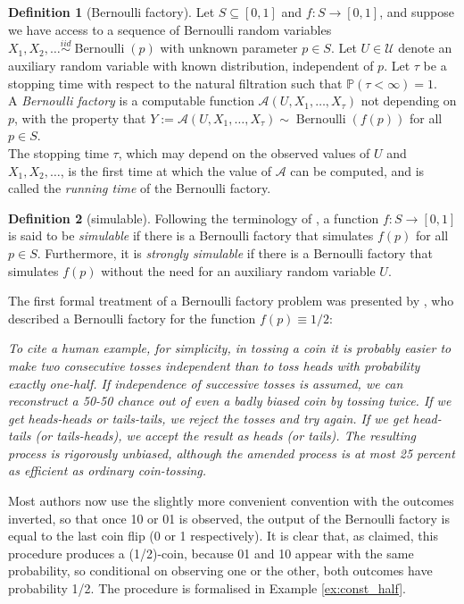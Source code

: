 \documentclass{article}
\theoremstyle{definition}
\newtheorem{defn}{Definition}
\newcommand{\PR}{\mathbb{P}}
\newcommand{\iidsim}{\overset{iid}{\sim}}
\newcommand{\Bern}{\operatorname{Bernoulli}}
\begin{document}
\begin{defn}[Bernoulli factory]\label{defn:BF}
Let $S \subseteq [0,1]$ and $f: S\to[0,1]$, and suppose we have access to a sequence of Bernoulli random variables $X_1,X_2,\dots \iidsim \Bern(p)$ with unknown parameter $p \in S$.
Let $U \in \mathcal{U}$ denote an auxiliary random variable with known distribution, independent of $p$. Let $\tau$ be a stopping time with respect to the natural filtration such that $\PR(\tau<\infty)=1$.\\
A \emph{Bernoulli factory} is a computable function $\mathcal{A}(U, X_1, \dots, X_\tau)$ not depending on $p$, with the property that $Y:=\mathcal{A}(U, X_1, \dots, X_\tau) \sim \Bern(f(p))$ for all $p\in S$.\\
The stopping time $\tau$, which may depend on the observed values of $U$ and $X_1, X_2, \dots$, is the first time at which the value of $\mathcal{A}$ can be computed, and is called the \emph{running time} of the Bernoulli factory.
\end{defn}

\begin{defn}[simulable]
Following the terminology of \citet{keane1994}, a function $f:S\to[0,1]$ is said to be \emph{simulable} if there is a Bernoulli factory that simulates $f(p)$ for all $p\in S$.
Furthermore, it is \emph{strongly simulable} if there is a Bernoulli factory that simulates $f(p)$ without the need for an auxiliary random variable $U$.
\end{defn}

The first formal treatment of a Bernoulli factory problem was presented by \citet{vonneumann1951}, who 
described a Bernoulli factory for the function $f(p)\equiv 1/2$:
\begin{displayquote}
\textit{To cite a human example, for simplicity, in tossing a coin it is probably easier to make two consecutive tosses independent than to toss heads with probability exactly one-half. If independence of successive tosses is assumed, we can reconstruct a 50-50 chance out of even a badly biased coin by tossing twice. If we get heads-heads or tails-tails, we reject the tosses and try again. If we get head-tails (or tails-heads), we accept the result as heads (or tails). The resulting process is rigorously unbiased, although the amended process is at most 25 percent as efficient as ordinary coin-tossing.}
\end{displayquote}

Most authors now use the slightly more convenient convention with the outcomes inverted, so that once 10 or 01 is observed, the output of the Bernoulli factory is equal to the last coin flip (0 or 1 respectively). 
It is clear that, as claimed, this procedure produces a (1/2)-coin, because 01 and 10 appear with the same probability, so conditional on observing one or the other, both outcomes have probability 1/2.
The procedure is formalised in Example \ref{ex:const_half}.
\end{document}

